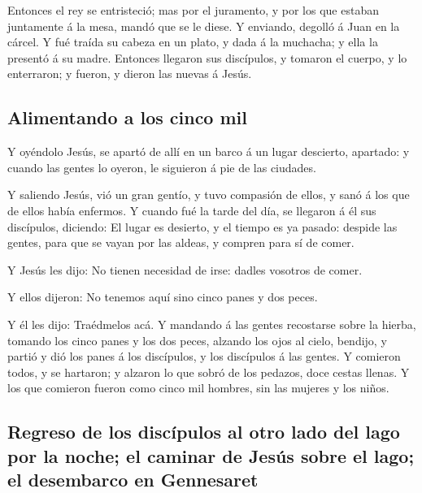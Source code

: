  Entonces el rey se entristeció; mas por el juramento, y
por los que estaban juntamente á la mesa, mandó que se le diese.
 Y enviando, degolló á Juan en la cárcel. 
Y fué traída su cabeza en un plato, y dada á la muchacha; y ella la
presentó á su madre.  Entonces llegaron sus discípulos, y
tomaron el cuerpo, y lo enterraron; y fueron, y dieron las nuevas á
Jesús.

\hypertarget{alimentando-a-los-cinco-mil}{%
\subsection{Alimentando a los cinco
mil}\label{alimentando-a-los-cinco-mil}}

 Y oyéndolo Jesús, se apartó de allí en un barco á un
lugar descierto, apartado: y cuando las gentes lo oyeron, le siguieron á
pie de las ciudades.

 Y saliendo Jesús, vió un gran gentío, y tuvo compasión
de ellos, y sanó á los que de ellos había enfermos.  Y
cuando fué la tarde del día, se llegaron á él sus discípulos, diciendo:
El lugar es desierto, y el tiempo es ya pasado: despide las gentes, para
que se vayan por las aldeas, y compren para sí de comer.

 Y Jesús les dijo: No tienen necesidad de irse: dadles
vosotros de comer.

 Y ellos dijeron: No tenemos aquí sino cinco panes y dos
peces.

 Y él les dijo: Traédmelos acá.  Y
mandando á las gentes recostarse sobre la hierba, tomando los cinco
panes y los dos peces, alzando los ojos al cielo, bendijo, y partió y
dió los panes á los discípulos, y los discípulos á las gentes.
 Y comieron todos, y se hartaron; y alzaron lo que sobró
de los pedazos, doce cestas llenas.  Y los que comieron
fueron como cinco mil hombres, sin las mujeres y los niños.

\hypertarget{regreso-de-los-discuxedpulos-al-otro-lado-del-lago-por-la-noche-el-caminar-de-jesuxfas-sobre-el-lago-el-desembarco-en-gennesaret}{%
\subsection{Regreso de los discípulos al otro lado del lago por la
noche; el caminar de Jesús sobre el lago; el desembarco en
Gennesaret}\label{regreso-de-los-discuxedpulos-al-otro-lado-del-lago-por-la-noche-el-caminar-de-jesuxfas-sobre-el-lago-el-desembarco-en-gennesaret}}

